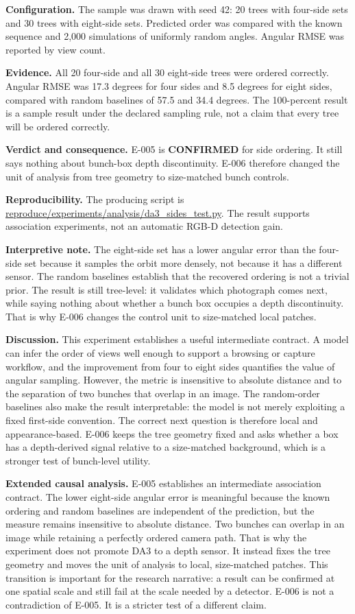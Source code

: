 \documentclass[preprint,12pt]{elsarticle}
\newcommand{\pathcode}[1]{\scriptsize\url{#1}}
\begin{document}
\textbf{Configuration.} The sample was drawn with seed 42: 20 trees with
four-side sets and 30 trees with eight-side sets. Predicted order was compared
with the known sequence and 2,000 simulations of uniformly random angles.
Angular RMSE was reported by view count.

\textbf{Evidence.} All 20 four-side and all 30 eight-side trees were ordered
correctly. Angular RMSE was 17.3 degrees for four sides and 8.5 degrees for
eight sides, compared with random baselines of 57.5 and 34.4 degrees. The
100-percent result is a sample result under the declared sampling rule, not a
claim that every tree will be ordered correctly.

\textbf{Verdict and consequence.} E-005 is \textbf{CONFIRMED} for side
ordering. It still says nothing about bunch-box depth discontinuity. E-006
therefore changed the unit of analysis from tree geometry to size-matched
bunch controls.

\textbf{Reproducibility.} The producing script is
\pathcode{reproduce/experiments/analysis/da3_sides_test.py}. The result
supports association experiments, not an automatic RGB-D detection gain.

\textbf{Interpretive note.} The eight-side set has a lower angular error than
the four-side set because it samples the orbit more densely, not because it
has a different sensor. The random baselines establish that the recovered
ordering is not a trivial prior. The result is still tree-level: it validates
which photograph comes next, while saying nothing about whether a bunch box
occupies a depth discontinuity. That is why E-006 changes the control unit to
size-matched local patches.

\textbf{Discussion.} This experiment establishes a useful intermediate
contract. A model can infer the order of views well enough to support a
browsing or capture workflow, and the improvement from four to eight sides
quantifies the value of angular sampling. However, the metric is insensitive
to absolute distance and to the separation of two bunches that overlap in an
image. The random-order baselines also make the result interpretable: the
model is not merely exploiting a fixed first-side convention. The correct next
question is therefore local and appearance-based. E-006 keeps the tree
geometry fixed and asks whether a box has a depth-derived signal relative to
a size-matched background, which is a stronger test of bunch-level utility.

\textbf{Extended causal analysis.} E-005 establishes an intermediate
association contract. The lower eight-side angular error is meaningful because
the known ordering and random baselines are independent of the prediction,
but the measure remains insensitive to absolute distance. Two bunches can
overlap in an image while retaining a perfectly ordered camera path. That is
why the experiment does not promote DA3 to a depth sensor. It instead fixes
the tree geometry and moves the unit of analysis to local, size-matched
patches. This transition is important for the research narrative: a result
can be confirmed at one spatial scale and still fail at the scale needed by a
detector. E-006 is not a contradiction of E-005. It is a stricter test of a
different claim.
\end{document}
